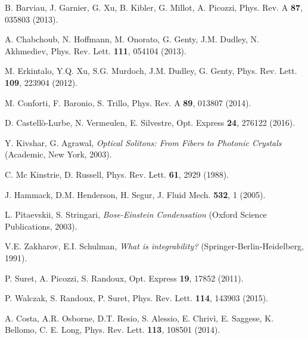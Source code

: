 \documentclass[pra,twocolumn,showpacs,preprintnumbers,amsmath,amssymb]{revtex4}
\begin{document}
\begin{thebibliography}{99}
B. Barviau, J. Garnier, G. Xu, B. Kibler, G. Millot, A. Picozzi,
Phys. Rev. A \textbf{87}, 035803 (2013).


A. Chabchoub, N. Hoffmann, M. Onorato, G. Genty, J.M. Dudley, N. Akhmediev,
Phys. Rev. Lett. {\bf 111}, 054104 (2013).


M. Erkintalo, Y.Q. Xu, S.G. Murdoch, J.M. Dudley, G. Genty, 
Phys. Rev. Lett. {\bf 109}, 223904 (2012).

M. Conforti, F. Baronio, S. Trillo, 
Phys. Rev. A {\bf 89}, 013807 (2014).

D. Castell\`o-Lurbe, N. Vermeulen, E. Silvestre,
Opt. Express {\bf 24}, 276122 (2016).


Y. Kivshar, G. Agrawal, {\it Optical Solitons: From
Fibers to Photonic Crystals} (Academic, New York, 2003).

C. Mc Kinstrie, D. Russell, Phys. Rev. Lett. {\bf 61}, 2929 (1988).

J. Hammack, D.M. Henderson, H. Segur,
J. Fluid Mech. {\bf 532}, 1 (2005).

L. Pitaevskii, S. Stringari, {\it Bose-Einstein Condensation}
(Oxford Science Publications, 2003).

V.E. Zakharov, E.I. Schulman, {\it What is integrability?} (Springer-Berlin-Heidelberg, 1991). 

P. Suret, A. Picozzi, S. Randoux,
Opt. Express {\bf 19}, 17852 (2011).


P. Walczak, S. Randoux, P. Suret,
Phys. Rev. Lett. {\bf 114}, 143903 (2015).

A. Costa, A.R. Osborne, D.T. Resio, S. Alessio, E. Chriv\`i, E. Saggese, K. Bellomo, C. E. Long,
Phys. Rev. Lett. {\bf 113}, 108501 (2014).


\end{thebibliography}
\end{document}
